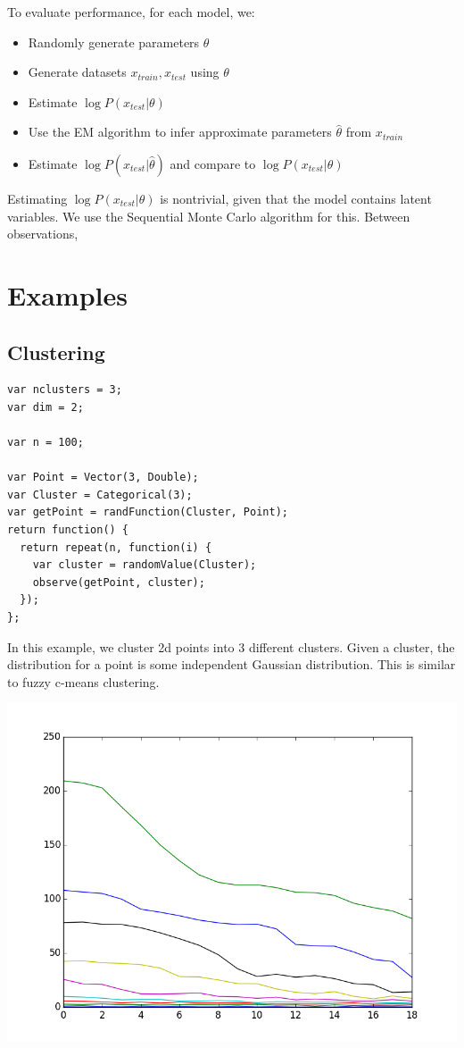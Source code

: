 \documentclass{article}
\begin{document}
    To evaluate performance, for each model, we:
    \begin{itemize}
      \item
        Randomly generate parameters $\theta$
      \item
        Generate datasets $x_{train}, x_{test}$ using $\theta$
      \item
        Estimate $\log P(x_{test} | \theta)$
      \item
        Use the EM algorithm to infer approximate parameters $\hat{\theta}$ from $x_{train}$
      \item
        Estimate $\log P(x_{test} | \hat{\theta})$ and compare to $\log P(x_{test} | \theta)$
    \end{itemize}
    Estimating $\log P(x_{test} | \theta)$ is nontrivial, given that the model contains latent variables.
    We use the Sequential Monte Carlo algorithm for this.  Between observations,


  \section{Examples}

  \subsection{Clustering}
{\small
\begin{lstlisting}
var nclusters = 3;
var dim = 2;

var n = 100;

var Point = Vector(3, Double);
var Cluster = Categorical(3);
var getPoint = randFunction(Cluster, Point);
return function() {
  return repeat(n, function(i) {
    var cluster = randomValue(Cluster);
    observe(getPoint, cluster);
  });
};
\end{lstlisting}
}

In this example, we cluster 2d points into 3 different clusters.  Given a cluster, the distribution for a point is some independent Gaussian distribution.  This is similar to fuzzy c-means clustering.

\begin{center}
  \includegraphics[scale=0.5]{../plots/accuracy_nd_clustering.png}
\end{center}
\end{document}
